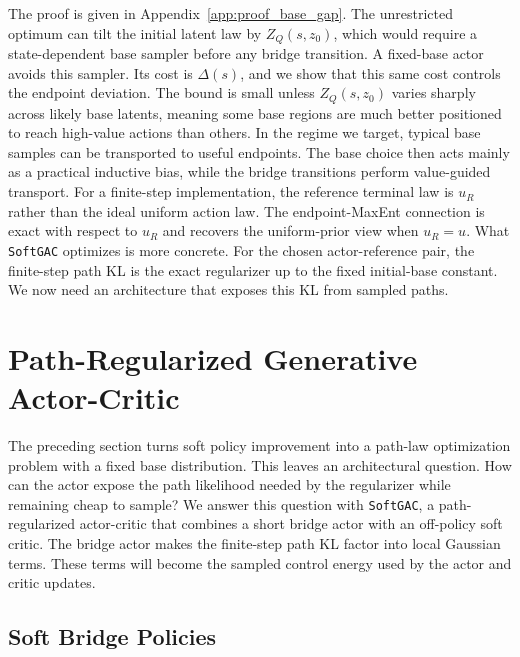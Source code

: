 \documentclass[11pt]{article}
\newcommand{\myalgo}{\texttt{SoftGAC}\xspace}
\begin{document}
The proof is given in Appendix~\ref{app:proof_base_gap}. The unrestricted optimum can tilt the initial latent law by $Z_Q(s,z_0)$, which would require a state-dependent base sampler before any bridge transition. A fixed-base actor avoids this sampler. Its cost is $\Delta(s)$, and we show that this same cost controls the endpoint deviation. The bound is small unless $Z_Q(s,z_0)$ varies sharply across likely base latents, meaning some base regions are much better positioned to reach high-value actions than others. In the regime we target, typical base samples can be transported to useful endpoints. The base choice then acts mainly as a practical inductive bias, while the bridge transitions perform value-guided transport. For a finite-step implementation, the reference terminal law is $u_R$ rather than the ideal uniform action law. The endpoint-MaxEnt connection is exact with respect to $u_R$ and recovers the uniform-prior view when $u_R=u$. What \myalgo optimizes is more concrete. For the chosen actor-reference pair, the finite-step path KL is the exact regularizer up to the fixed initial-base constant. We now need an architecture that exposes this KL from sampled paths.

\section{Path-Regularized Generative Actor-Critic}

The preceding section turns soft policy improvement into a path-law optimization problem with a fixed base distribution. This leaves an architectural question. How can the actor expose the path likelihood needed by the regularizer while remaining cheap to sample? We answer this question with \myalgo, a path-regularized actor-critic that combines a short bridge actor with an off-policy soft critic. The bridge actor makes the finite-step path KL factor into local Gaussian terms. These terms will become the sampled control energy used by the actor and critic updates.

\subsection{Soft Bridge Policies}
\end{document}
